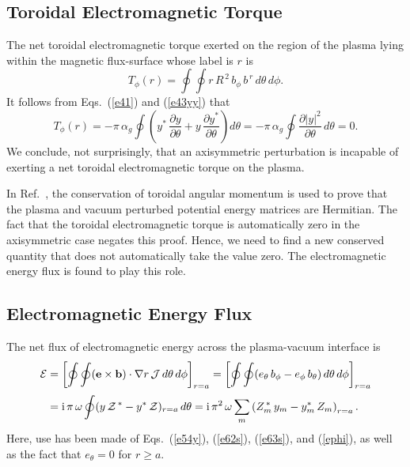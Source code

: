 \documentclass[12pt,prb,aps]{revtex4-1}
\begin{document}
\subsection{Toroidal Electromagnetic Torque}\label{storque}
The net toroidal electromagnetic torque exerted on the region of the plasma lying within the magnetic flux-surface whose label is $r$ is\,\cite{tj}
\begin{equation}
T_\phi(r)= \oint\oint r\,R^{\,2}\,b_\phi\,b^{\,r}\,d\theta\,d\phi.
\end{equation}
It follows from Eqs.~(\ref{e41}) and (\ref{e43yy}) that 
\begin{equation}
T_\phi(r) = -\pi\,\alpha_g\oint\left(y^\ast\,\frac{\partial y}{\partial\theta}+y\,\frac{\partial y^\ast}{\partial\theta}\right)d\theta
= -\pi\,\alpha_g\oint\frac{\partial|y|^2}{\partial\theta}\,d\theta = 0.
\end{equation}
We conclude, not surprisingly,  that an axisymmetric perturbation is incapable of exerting a net toroidal electromagnetic torque on the plasma. 

In Ref.~, the conservation of toroidal angular momentum is used to prove that the plasma and vacuum perturbed potential energy matrices are Hermitian.
The fact that the toroidal electromagnetic torque is automatically zero in the axisymmetric case negates this proof. Hence, we need to find a new conserved quantity
that does not automatically take the value zero. The electromagnetic energy flux is found to play this role. 

\subsection{Electromagnetic Energy Flux}
The net flux of electromagnetic energy across the plasma-vacuum interface is 
\begin{align}\label{eflux}
{\cal E} &= \left[\oint\oint ({\bf e}\times {\bf b})\cdot\nabla r\,{\cal J}\,d\theta\,d\phi\right]_{r=a}= \left[\oint\oint (e_\theta\,b_\phi-e_\phi\,b_\theta)\,d\theta\,d\phi\right]_{r=a}\nonumber\\[0.5ex]
&={\rm i}\,\pi\,\omega\oint (y\,{\cal Z}^{\,\ast}-y^\ast \,{\cal Z})_{r=a}\,d\theta={\rm i}\,\pi^2\,\omega \sum_{m}\left(Z_m^{\,\ast}\,y_m-y_m^\ast\,Z_m\right)_{r=a}.
\end{align}
Here, use has been made of Eqs.~(\ref{e54y}), (\ref{e62s}), (\ref{e63s}),  and  (\ref{ephi}), as well as  the fact that $e_\theta=0$ for $r\geq a$. 
\end{document}
